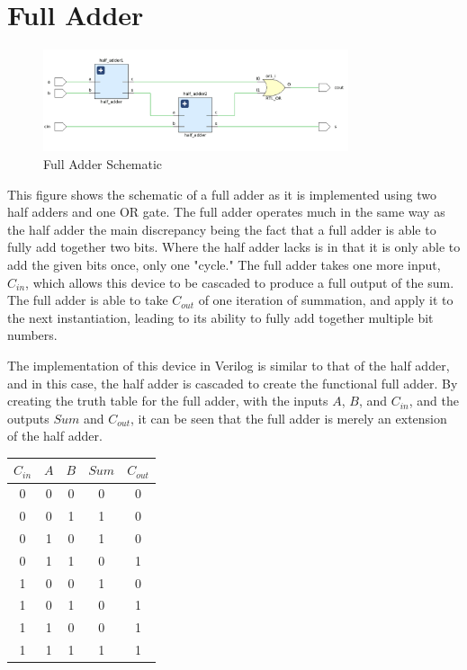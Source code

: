 \documentclass[12pt]{article}
\begin{document}
    \section*{Full Adder}
    \begin{figure}[h]
        \centering
        \includegraphics[width=0.8\textwidth]{Full Adder Schematic.png}
        \caption{Full Adder Schematic}
        \label{fig:Full-Adder-Schematic}
    \end{figure}
    \par This figure shows the schematic of a full adder as it is implemented
    using two half adders and one OR gate. The full adder operates much in the
    same way as the half adder the main discrepancy being the fact that a full
    adder is able to fully add together two bits. Where the half adder lacks is
    in that it is only able to add the given bits once, only one "cycle." The
    full adder takes one more input, $C_{in}$, which allows this device to be
    cascaded to produce a full output of the sum. The full adder is able to take
    $C_{out}$ of one iteration of summation, and apply it to the next
    instantiation, leading to its ability to fully add together multiple bit
    numbers.
    \par The implementation of this device in Verilog is similar to that of the
    half adder, and in this case, the half adder is cascaded to create the
    functional full adder. By creating the truth table for the full adder, with
    the inputs $A$, $B$, and $C_{in}$, and the outputs $Sum$ and $C_{out}$, it
    can be seen that the full adder is merely an extension of the half adder.
    \begin{table}[h]
        \centering
        \begin{tabular}{ccc|cc}
            \toprule
            $C_{in}$ & $A$ & $B$ & $Sum$ & $C_{out}$ \\
            \midrule
            0 & 0 & 0 & 0 & 0 \\
            0 & 0 & 1 & 1 & 0 \\
            0 & 1 & 0 & 1 & 0 \\
            0 & 1 & 1 & 0 & 1 \\
            1 & 0 & 0 & 1 & 0 \\
            1 & 0 & 1 & 0 & 1 \\
            1 & 1 & 0 & 0 & 1 \\
            1 & 1 & 1 & 1 & 1 \\
            \bottomrule
        \end{tabular}
    \end{table}
\end{document}
